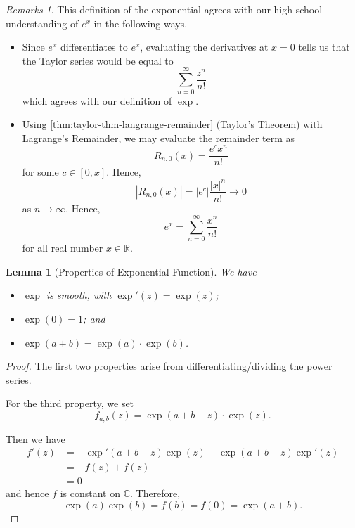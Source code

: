 \documentclass[11pt]{article}
\numberwithin{equation}{section}
\newtheorem{lemma}[theorem]{Lemma}
\theoremstyle{definition}
\theoremstyle{remark}
\newtheorem{remarks}[theorem]{Remarks}
\newcommand{\pqty}[1]{\left(#1\right)}
\newcommand{\abs}[1]{\left|#1\right|}
\newcommand{\ccintv}[2]{[#1,#2]}
\newcommand{\RR}{\mathbb R}
\newcommand{\CC}{\mathbb C}
\begin{document}
\begin{remarks}\label{analysis-unit-0218}
    This definition of the exponential agrees with our high-school understanding of \(e^x\) in the following ways.
    \begin{itemize}
        \item Since \(e^x\) differentiates to \(e^x\), evaluating the derivatives at \(x = 0\) tells us that the Taylor series would be equal to
        \[
            \sum_{n = 0}^{\infty} \frac{z^n}{n!}
        \]
        which agrees with our definition of \(\exp\).

        \item Using \autoref{thm:taylor-thm-langrange-remainder} (Taylor's Theorem) with Lagrange's Remainder, we may evaluate the remainder term as
        \[
            R_{n, 0} \pqty{x} = \frac{e^c x^n}{n!}
        \]
        for some \(c \in \ccintv{0}{x}\). Hence,
        \[
            \abs{R_{n, 0} \pqty{x}} = \abs{e^c} \frac{\abs{x}^n}{n!} \to 0
        \]
        as \(n \to \infty\). Hence,
        \[
            e^x = \sum_{n = 0}^{\infty} \frac{x^n}{n!}
        \]
        for all real number \(x \in \RR\).
    \end{itemize}
\end{remarks}

\begin{lemma}[Properties of Exponential Function]\label{analysis-unit-0219}
    \label{lem:properties-exp}%
    We have
    \begin{itemize}
        \item \(\exp\) is smooth, with \(\exp'\pqty{z} = \exp\pqty{z}\);
        \item \(\exp\pqty{0} = 1\); and
        \item \(\exp\pqty{a + b} = \exp\pqty{a} \cdot \exp\pqty{b}\).
    \end{itemize}
\end{lemma}

\begin{proof}
    The first two properties arise from differentiating/dividing the power series.

    For the third property, we set
    \[
        f_{a, b} \pqty{z} = \exp\pqty{a + b - z} \cdot \exp\pqty{z}.
    \]

    Then we have
    \begin{align*}
        f'\pqty{z} &= - \exp'\pqty{a + b - z} \exp\pqty{z} + \exp\pqty{a + b - z} \exp'\pqty{z} \\
        &= - f\pqty{z} + f\pqty{z} \\
        &= 0
    \end{align*}
    and hence \(f\) is constant on \(\CC\). Therefore,
    \[
        \exp\pqty{a} \exp\pqty{b} = f\pqty{b} = f\pqty{0} = \exp\pqty{a + b}.
    \]
\end{proof}
\end{document}
